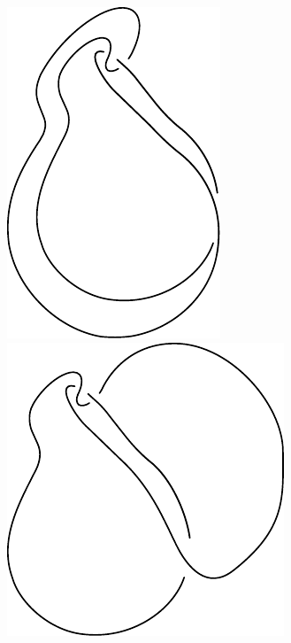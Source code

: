 \documentclass{beamer}
\begin{document}
\begin{frame}
\begin{columns}[c]
\includegraphics[width=.9\textwidth]{knot_pix/knot_2.pdf}
\pause
\includegraphics[width=.9\textwidth]{knot_pix/knot_3.pdf}

\end{columns}
\end{frame}
\end{document}
